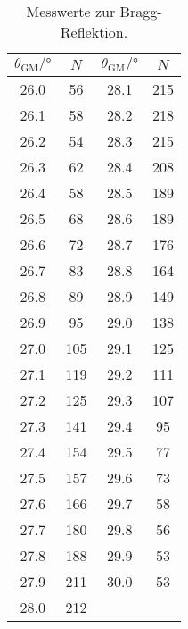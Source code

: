 \begin{table}[H]
    \centering
    \caption{Messwerte zur Bragg-Reflektion.}
    \begin{tabular}{S[table-format=2.1] c | S[table-format=2.1] c}
    \toprule
    {$\theta_\text{GM} /\si{\degree}$} &
    {$N$} &
    {$\theta_\text{GM} /\si{\degree}$} &
    {$N$} \\
    \midrule
    \num{26.0} & \num{56}  & \num{28.1} & \num{215} \\
    \num{26.1} & \num{58}  & \num{28.2} & \num{218} \\
    \num{26.2} & \num{54}  & \num{28.3} & \num{215} \\
    \num{26.3} & \num{62}  & \num{28.4} & \num{208} \\
    \num{26.4} & \num{58}  & \num{28.5} & \num{189} \\
    \num{26.5} & \num{68}  & \num{28.6} & \num{189} \\
    \num{26.6} & \num{72}  & \num{28.7} & \num{176} \\
    \num{26.7} & \num{83}  & \num{28.8} & \num{164} \\
    \num{26.8} & \num{89}  & \num{28.9} & \num{149} \\
    \num{26.9} & \num{95}  & \num{29.0} & \num{138} \\
    \num{27.0} & \num{105} & \num{29.1} & \num{125} \\
    \num{27.1} & \num{119} & \num{29.2} & \num{111} \\
    \num{27.2} & \num{125} & \num{29.3} & \num{107} \\
    \num{27.3} & \num{141} & \num{29.4} & \num{95}  \\
    \num{27.4} & \num{154} & \num{29.5} & \num{77}  \\
    \num{27.5} & \num{157} & \num{29.6} & \num{73}  \\
    \num{27.6} & \num{166} & \num{29.7} & \num{58}  \\
    \num{27.7} & \num{180} & \num{29.8} & \num{56}  \\
    \num{27.8} & \num{188} & \num{29.9} & \num{53}  \\
    \num{27.9} & \num{211} & \num{30.0} & \num{53}  \\
    \num{28.0} & \num{212} &            &           \\
    \bottomrule
    \end{tabular}
  \end{table}
  
